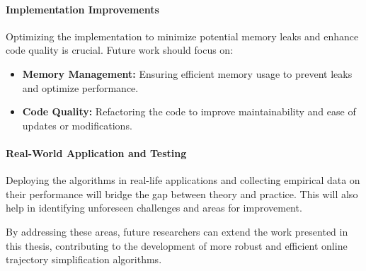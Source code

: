 \paragraph{Implementation Improvements}
Optimizing the implementation to minimize potential memory leaks and enhance code quality is crucial. Future work should focus on:
\begin{itemize}
    \item \textbf{Memory Management:} Ensuring efficient memory usage to prevent leaks and optimize performance.
    \item \textbf{Code Quality:} Refactoring the code to improve maintainability and ease of updates or modifications.
\end{itemize}

\paragraph{Real-World Application and Testing}
Deploying the algorithms in real-life applications and collecting empirical data on their performance will bridge the gap between theory and practice. This will also help in identifying unforeseen challenges and areas for improvement.

By addressing these areas, future researchers can extend the work presented in this thesis, contributing to the development of more robust and efficient online trajectory simplification algorithms.


